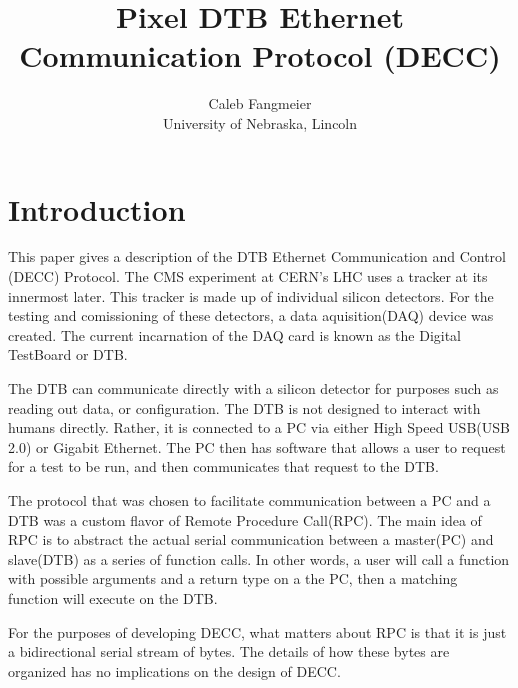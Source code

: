 \documentclass{article}
\title{Pixel DTB Ethernet Communication Protocol (DECC)}
\author{Caleb Fangmeier \\ University of Nebraska, Lincoln}
\begin{document}
\maketitle
\tableofcontents

\section{Introduction}
This paper gives a description of the DTB Ethernet Communication and Control
(DECC) Protocol. The CMS experiment at CERN's LHC uses a tracker at its
innermost later. This tracker is made up of individual silicon detectors. For
the testing and comissioning of these detectors, a data aquisition(DAQ) device
was created. The current incarnation of the DAQ card is known as the Digital
TestBoard or DTB. 

The DTB can communicate directly with a silicon detector for
purposes such as reading out data, or configuration. The DTB is not designed to
interact with humans directly. Rather, it is connected to a PC via either
High Speed USB(USB 2.0) or Gigabit Ethernet. The PC then has software that
allows a user to request for a test to be run, and then communicates that
request to the DTB. 

The protocol that was chosen to facilitate communication between a PC and a DTB
was a custom flavor of Remote Procedure Call(RPC). The main idea of RPC is to
abstract the actual serial communication between a master(PC) and slave(DTB) as
a series of function calls. In other words, a user will call a function with
possible arguments and a return type on a the PC, then a matching function will
execute on the DTB. 

For the purposes of developing DECC, what matters about RPC is that it is just a
bidirectional serial stream of bytes. The details of how these bytes are
organized has no implications on the design of DECC. 
\end{document}
